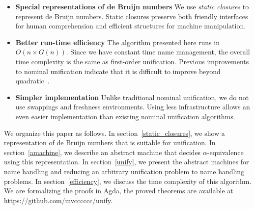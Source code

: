 \documentclass[a4paper,UKenglish]{lipics-v2016}
\begin{document}
\begin{itemize}
\item \textbf{Special representations of de Bruijn numbers}
  We use \textit{static closures} to represent de Bruijn numbers.
  Static closures preserve both friendly interfaces for human comprehension
  and efficient structures for machine manipulation.
  
\item \textbf{Better run-time efficiency}
  The algorithm presented here runs in $O(n \times G(n))$.
  Since we have constant time name management,
  the overall time complexity is the same as first-order unification.
  Previous improvements to nominal unification indicate
  that it is difficult to improve beyond quadratic~\cite
  {calves_polynomial_2008, calves_complexity_2010, calves_first-order_2010, levy_efficient_2010}.

\item \textbf{Simpler implementation}
  Unlike traditional nominal unification,
  we do not use swappings and freshness environments.
  Using less infrastructure allows an even easier implementation
  than existing nominal unification algorithms.

 \end{itemize} 

  We organize this paper as follows.
  In section~\ref{static_closures}, we show a representation of
  de Bruijn numbers that is suitable for unification.
  In section~\ref{amachine}, we describe an abstract machine that decides
  $\alpha$-equivalence using this representation.
  In section~\ref{unify}, we present the abstract machines for name handling
  and reducing an arbitrary unification problem to name handling problems.
  In section~\ref{efficiency}, we discuss the time complexity of this algorithm.
  We are formalizing the proofs in Agda,
  the proved theorems are available at https://github.com/mvcccccc/unify.


\end{document}
